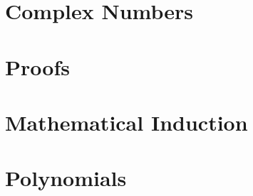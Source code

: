 \appendix
\renewcommand\chaptername{Appendix}
 \chapter{Complex Numbers}\label{chap:appacomplexnumbers}
 	

\chapter{Proofs}\label{chap:appbproofs}
	

\chapter{Mathematical Induction}\label{chap:appcinduction}
	

\chapter{Polynomials}\label{chap:appdpolynomials}
	




